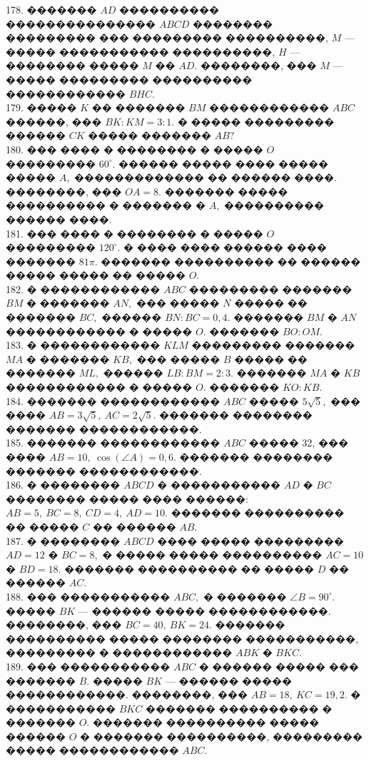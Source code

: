 \documentclass[12pt]{article}
\begin{document}
178. ������� $AD$ ���������� ��������������� $ABCD$ �������� ��������� ��� ��������� ����������, $M$ --- ����� ����������� ����������, $H$ --- �������� ����� $M$ �� $AD.$ ��������, ��� $M$ --- ����� ��������� ���������� ������������ $BHC.$\\
179. ����� $K$ �� ������� $BM$ ������������ $ABC$ ������, ��� $BK:KM=3:1.$ � ����� ��������� ������ $CK$ ����� ������� $AB?$\\
180. ��� ���� � �������� � ����� $O$ ��������� $60^\circ.$ ������ ����� ���� ����� ����� $A,$ ������������� �� ������ ����. ��������, ��� $OA=8.$ ������� ����� ���������� � ������� � $A,$ ���������� ������ ����.\\
181. ��� ���� � �������� � ����� $O$ ��������� $120^\circ.$ � ���� ���� ������ ���� ������� $81\pi.$ ������� ���������� �� ������ ����� ����� �� ����� $O.$\\
182. � ������������ $ABC$ ��������� ������� $BM$ � ������� $AN,$ ��� ����� $N$ ����� �� ������� $BC,$ ������ $BN:BC=0,4.$ ������� $BM$ � $AN$ ������������ � ����� $O.$ ������� $BO:OM.$\\
183. � ������������ $KLM$ ��������� ������� $MA$ � ������� $KB,$ ��� ����� $B$ ����� �� ������� $ML,$ ������ $LB:BM=2:3.$ ������� $MA$ � $KB$ ������������ � ����� $O.$ ������� $KO:KB.$\\
184. ������� ������������ $ABC$ ����� $5\sqrt{5},$ ��� ���� $AB=3\sqrt{5},\ AC=2\sqrt{5}.$ ������� �������� ������� ������������.\\
185. ������� ������������ $ABC$ ����� 32, ��� ���� $AB=10,\ \cos(\angle A)=0,6.$ ������� �������� ������� ������������.\\
186. � �������� $ABCD$ � ����������� $AD$ � $BC$ �������� ����� ���� ������: $AB=5,\ BC=8,\ CD=4,\ AD=10.$ ������� ���������� �� ����� $C$ �� ������ $AB.$\\
187. � �������� $ABCD$ ���� ����� ��������� $AD=12$ � $BC=8,$ � ����� ����� ���������� $AC=10$ � $BD=18.$ ������� ���������� �� ����� $D$ �� ������ $AC.$\\
188. ��� ����������� $ABC,$ � ������� $\angle B=90^\circ.$ ����� $BK$ --- ������ ����� ������������. ��������, ��� $BC=40,\ BK=24.$ ������� ���������� ����� �������� �����������, ��������� � ������������ $ABK$ � $BKC.$\\
189. ��� ����������� $ABC$ � ������ ����� ��� ������� $B.$ ����� $BK$ --- ������ ����� ������������. ��������, ��� $AB=18,\ KC=19,2.$ � ����������� $BKC$ ������� ���������� � ������� $O.$ ������� ���������� ����� ������ $O$ � ������� ����������, ��������� ����� ������������ $ABC.$\\
\end{document}
